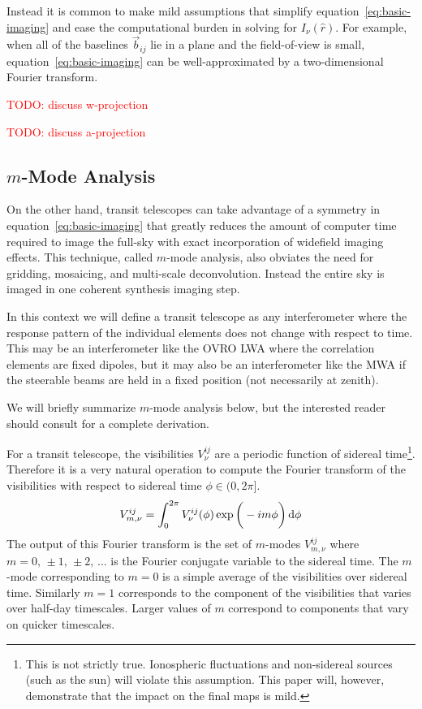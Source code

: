 \documentclass[twocolumn]{aastex6}
\renewcommand{\d}{{\rm d}}
\newcommand{\todo}[1]{\textcolor{red}{TODO: #1}\PackageWarning{TODO:}{#1!}}
\begin{document}
Instead it is common to make mild assumptions that simplify equation~\ref{eq:basic-imaging} and ease
the computational burden in solving for $I_\nu(\hat r)$. For example, when all of the baselines
$\vec b_{ij}$ lie in a plane and the field-of-view is small, equation~\ref{eq:basic-imaging} can be
well-approximated by a two-dimensional Fourier transform.

\todo{discuss w-projection}

\todo{discuss a-projection}

\citet{2017MNRAS.465.2901Z}

\subsection{$m$-Mode Analysis}

On the other hand, transit telescopes can take advantage of a symmetry in
equation~\ref{eq:basic-imaging} that greatly reduces the amount of computer time required to image
the full-sky with exact incorporation of widefield imaging effects. This technique, called $m$-mode
analysis, also obviates the need for gridding, mosaicing, and multi-scale deconvolution. Instead the
entire sky is imaged in one coherent synthesis imaging step.

In this context we will define a transit telescope as any interferometer where the response pattern
of the individual elements does not change with respect to time. This may be an interferometer like
the OVRO LWA where the correlation elements are fixed dipoles, but it may also be an interferometer
like the MWA if the steerable beams are held in a fixed position (not necessarily at zenith).

We will briefly summarize $m$-mode analysis below, but the interested reader should consult
\citet{2014ApJ...781...57S, 2015PhRvD..91h3514S} for a complete derivation.

For a transit telescope, the visibilities $V^{ij}_\nu$ are a periodic function of sidereal
time\footnote{
    This is not strictly true. Ionospheric fluctuations and non-sidereal sources (such as the sun)
    will violate this assumption. This paper will, however, demonstrate that the impact on the final
    maps is mild.
}.
Therefore it is a very natural operation to compute the Fourier transform of the visibilities with
respect to sidereal time $\phi\in(0,2\pi]$.
\begin{equation}
    V^{ij}_{m,\nu} = \int_0^{2\pi} V^{ij}_\nu(\phi)\exp\bigg(-im\phi\bigg)\,\d\phi
\end{equation}
The output of this Fourier transform is the set of $m$-modes $V^{ij}_{m,\nu}$ where
$m=0,\,\pm1,\,\pm2,\,\ldots$ is the Fourier conjugate variable to the sidereal time. The $m$-mode
corresponding to $m=0$ is a simple average of the visibilities over sidereal time. Similarly $m=1$
corresponds to the component of the visibilities that varies over half-day timescales. Larger values
of $m$ correspond to components that vary on quicker timescales.
\end{document}
